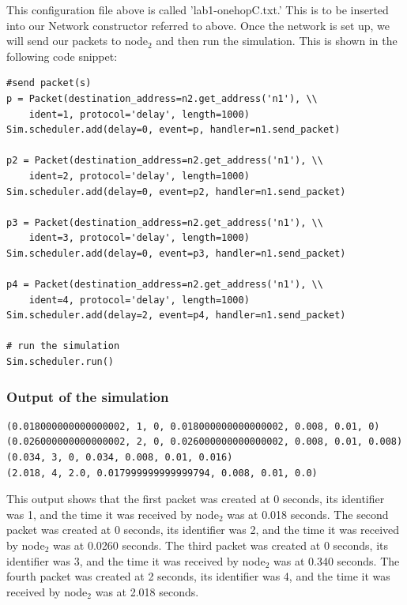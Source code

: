 \documentclass[fleqn,11pt]{article}
\begin{document}
This configuration file above is called 'lab1-onehopC.txt.' This is to be inserted into our Network constructor referred to above.
Once the network is set up, we will send our packets to node$_2$ and then run the simulation. This is shown in the following code snippet:    

\begin{lstlisting}
#send packet(s)
p = Packet(destination_address=n2.get_address('n1'), \\
	ident=1, protocol='delay', length=1000)
Sim.scheduler.add(delay=0, event=p, handler=n1.send_packet)

p2 = Packet(destination_address=n2.get_address('n1'), \\
	ident=2, protocol='delay', length=1000)
Sim.scheduler.add(delay=0, event=p2, handler=n1.send_packet)

p3 = Packet(destination_address=n2.get_address('n1'), \\
	ident=3, protocol='delay', length=1000)
Sim.scheduler.add(delay=0, event=p3, handler=n1.send_packet)

p4 = Packet(destination_address=n2.get_address('n1'), \\
	ident=4, protocol='delay', length=1000)
Sim.scheduler.add(delay=2, event=p4, handler=n1.send_packet)    

# run the simulation
Sim.scheduler.run()
\end{lstlisting}

\subsubsection{Output of the simulation}
\begin{lstlisting}
(0.018000000000000002, 1, 0, 0.018000000000000002, 0.008, 0.01, 0)
(0.026000000000000002, 2, 0, 0.026000000000000002, 0.008, 0.01, 0.008)
(0.034, 3, 0, 0.034, 0.008, 0.01, 0.016)
(2.018, 4, 2.0, 0.017999999999999794, 0.008, 0.01, 0.0)

\end{lstlisting}
This output shows that the first packet was created at 0 seconds, its identifier was 1, and the time it was received by node$_2$ was at 0.018 seconds. The second packet was created at 0 seconds, its identifier was 2, and the time it was received by node$_2$ was at 0.0260 seconds. The third packet was created at 0 seconds, its identifier was 3, and the time it was received by node$_2$ was at 0.340 seconds. The fourth packet was created at 2 seconds, its identifier was 4, and the time it was received by node$_2$ was at 2.018 seconds.
\end{document}
